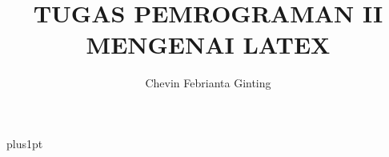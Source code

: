\documentclass[12pt]{ociamthesis}  %
\title{\large TUGAS PEMROGRAMAN II MENGENAI LATEX \\[1ex]}   %
\author{Chevin Febrianta Ginting}
\begin{document}
\baselineskip=18pt plus1pt




\maketitle                  %
 
\end{document}
